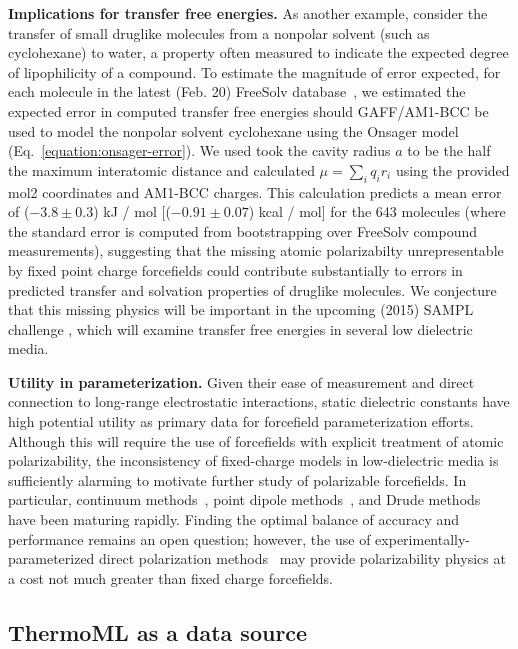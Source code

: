 \documentclass[aps,pre,twocolumn,nofootinbib,superscriptaddress,linenumbers]{revtex4-1}
\begin{document}
{\bf Implications for transfer free energies.}
As another example, consider the transfer of small druglike molecules from a nonpolar solvent (such as cyclohexane) to water, a property often measured to indicate the expected degree of lipophilicity of a compound.
To estimate the magnitude of error expected, for each molecule in the latest (Feb. 20) FreeSolv database~\cite{freesolv, freesolv_github}, we estimated the expected error in computed transfer free energies should GAFF/AM1-BCC be used to model the nonpolar solvent cyclohexane using the Onsager model (Eq.~\ref{equation:onsager-error}).
We used took the cavity radius $a$ to be the half the maximum interatomic distance and calculated $\mu = \sum_i q_i r_i$ using the provided mol2 coordinates and AM1-BCC charges.  
This calculation predicts a mean error of ($-3.8 \pm 0.3$) kJ / mol [($-0.91 \pm0.07$) kcal / mol] for the 643 molecules (where the standard error is computed from bootstrapping over FreeSolv compound measurements), 
suggesting that the missing atomic polarizabilty unrepresentable by fixed point charge forcefields could contribute substantially to errors in predicted transfer and solvation properties of druglike molecules.  
We conjecture that this missing physics will be important in the upcoming (2015) SAMPL challenge \cite{newman2009practical}, which will examine transfer free energies in several low dielectric media. 

{\bf Utility in parameterization.}
Given their ease of measurement and direct connection to long-range electrostatic interactions, static dielectric constants have high potential utility as primary data for forcefield parameterization efforts.  
Although this will require the use of forcefields with explicit treatment of atomic polarizability, the inconsistency of fixed-charge models in low-dielectric media is sufficiently alarming to motivate further study of polarizable forcefields.  In particular, continuum methods~\cite{truchon2010using, truchon2009integrated, truchon2008accurate}, point dipole methods~\cite{Ponder2010, ren2004temperature}, and Drude methods~\cite{lamoureux2003modeling, anisimov2005determination} have been maturing rapidly.  Finding the optimal balance of accuracy and performance remains an open question; however, the use of experimentally-parameterized direct polarization methods~\cite{wang2013systematic} may provide polarizability physics at a cost not much greater than fixed charge forcefields.


\subsection{ThermoML as a data source}
\end{document}
